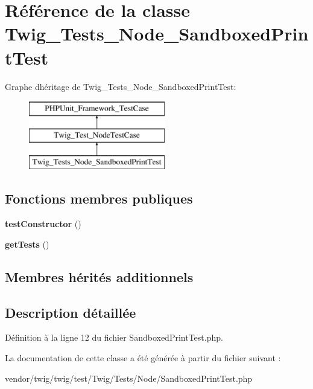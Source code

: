 \hypertarget{class_twig___tests___node___sandboxed_print_test}{}\section{Référence de la classe Twig\+\_\+\+Tests\+\_\+\+Node\+\_\+\+Sandboxed\+Print\+Test}
\label{class_twig___tests___node___sandboxed_print_test}
Graphe d\textquotesingle{}héritage de Twig\+\_\+\+Tests\+\_\+\+Node\+\_\+\+Sandboxed\+Print\+Test\+:\begin{figure}[H]
\begin{center}
\leavevmode
\includegraphics[height=3.000000cm]{class_twig___tests___node___sandboxed_print_test}
\end{center}
\end{figure}
\subsection*{Fonctions membres publiques}
\begin{DoxyCompactItemize}
\item 
{\bfseries test\+Constructor} ()\hypertarget{class_twig___tests___node___sandboxed_print_test_a47094dc941e72950570900d1418f89c6}{}\label{class_twig___tests___node___sandboxed_print_test_a47094dc941e72950570900d1418f89c6}

\item 
{\bfseries get\+Tests} ()\hypertarget{class_twig___tests___node___sandboxed_print_test_a7e247dd31cc8d37a6c97353a062a0080}{}\label{class_twig___tests___node___sandboxed_print_test_a7e247dd31cc8d37a6c97353a062a0080}

\end{DoxyCompactItemize}
\subsection*{Membres hérités additionnels}


\subsection{Description détaillée}


Définition à la ligne 12 du fichier Sandboxed\+Print\+Test.\+php.



La documentation de cette classe a été générée à partir du fichier suivant \+:\begin{DoxyCompactItemize}
\item 
vendor/twig/twig/test/\+Twig/\+Tests/\+Node/Sandboxed\+Print\+Test.\+php\end{DoxyCompactItemize}

